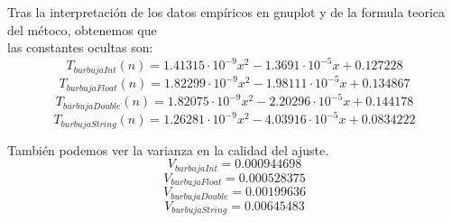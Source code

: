 \documentclass[11pt]{article}
\begin{document}
Tras la interpretación de los datos empíricos en gnuplot y de la formula teorica del métoco, obtenemos que \\
las constantes ocultas son:
\begin{equation*}
    T_{burbujaInt}(n)=1.41315 \cdot 10^{-9}x^{2}-1.3691 \cdot 10^{-5}x+0.127228
\end{equation*}
\begin{equation*}
    T_{burbujaFloat}(n)=1.82299 \cdot 10^{-9}x^{2}-1.98111 \cdot 10^{-5}x+0.134867 
\end{equation*}
\begin{equation*}
    T_{burbujaDouble}(n)=1.82075 \cdot 10^{-9}x^{2}-2.20296 \cdot 10^{-5}x+0.144178 
\end{equation*}
\begin{equation*}
    T_{burbujaString}(n)=1.26281 \cdot 10^{-9}x^{2}-4.03916 \cdot 10^{-5}x+0.0834222 
\end{equation*}

También podemos ver la varianza en la calidad del ajuste. 
\begin{equation*}
    V_{burbujaInt}=0.000944698
\end{equation*}
\begin{equation*}
    V_{burbujaFloat}=0.000528375
\end{equation*}
\begin{equation*}
    V_{burbujaDouble}=0.00199636
\end{equation*}
\begin{equation*}
    V_{burbujaString}=0.00645483
\end{equation*}
\end{document}
